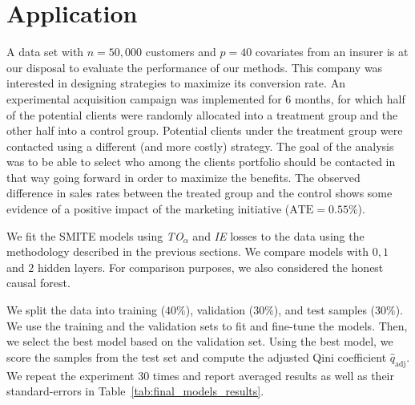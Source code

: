 \documentclass{article}
\def\qadj{\hat{q}_{\mathrm{adj}}}
\begin{document}
\newpage
\section{Application}
\label{sec:application}

A data set with $n=50,000$ customers and $p=40$ covariates from an insurer is at our disposal to evaluate the performance of our methods. This company was interested in designing strategies to maximize its conversion rate. An experimental acquisition campaign was implemented for 6 months, for which half of the potential clients were randomly allocated into a treatment group and the other half into a control group. Potential clients under the treatment group were contacted using a different (and more costly) strategy. The goal of the analysis was to be able to select who among the clients portfolio should be contacted in that way going forward in order to maximize the benefits. The observed difference in sales rates between the treated group and the control shows some evidence of a positive impact of the marketing initiative ($\mathrm{ATE}=0.55\%$).

We fit the SMITE models using {\it TO$_{\alpha}$} and {\it IE} losses to the data using the methodology described in the previous sections. We compare models with $0,1$ and $2$ hidden layers. For comparison purposes, we also considered the honest causal forest.

We split the data into training ($40\%$), validation ($30\%$), and test samples ($30\%$). We use the training and the validation sets to fit and fine-tune the models. Then, we select the best model based on the validation set. Using the best model, we score the samples from the test set and compute the adjusted Qini coefficient $\qadj$. We repeat the experiment $30$ times and report averaged results as well as their standard-errors in Table~\ref{tab:final_models_results}.
\end{document}
